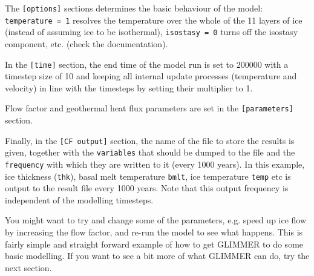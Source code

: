 The \texttt{[options]} sections determines the basic behaviour of the model:\\
\texttt{temperature = 1} resolves the temperature over the whole of the 11
layers of ice (instead of assuming ice to be isothermal), \texttt{isostasy = 0}
turns off the isostasy component, etc. (check the documentation).

In the \texttt{[time]} section, the end time of the model run is set to 200000
with a timestep size of 10 and keeping all internal update processes
(temperature and velocity) in line with the timesteps by setting their
multiplier to 1.

Flow factor and geothermal heat flux parameters are set in the
\texttt{[parameters]} section.

Finally, in the \texttt{[CF output]} section, the name of the file to store the results
is given, together with the \texttt{variables} that should be dumped to the file and the
\texttt{frequency} with which they are written to it (every 1000 years). In this example, 
ice thickness (\texttt{thk}), basal melt temperature \texttt{bmlt}, ice temperature \texttt{temp} etc 
is output to the result file every 1000 years. Note that this output frequency is independent of the
modelling timesteps.

You might want to try and change some of the parameters, e.g. speed up ice flow by 
increasing the flow factor, and re-run the model to see what happens.
This is fairly simple and straight forward example of how to get GLIMMER to do some 
basic modelling. If you want to see a bit more of what GLIMMER can do, try the next section.
